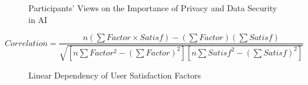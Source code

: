 \documentclass[12pt]{article}
\begin{document}
\begin{figure}[bht]
	\begin{center}
	{}
	\end{center}
	\vspace{-5mm} %
\caption{Participants' Views on the Importance of Privacy and Data Security in AI}
	\label{privacy and data security}
	\end{figure}
 
  \begin{equation}\label{correlation}
   Correlation = \frac{n(\sum Factor\times Satisf) - (\sum Factor)(\sum Satisf)}{\sqrt{[n\sum Factor^2 - (\sum Factor)^2][n\sum Satisf^2 - (\sum Satisf)^2]}}
  \end{equation}

\begin{figure}[bht]
	\begin{center}
	{}
	\end{center}
	\vspace{-5mm} %
\caption{Linear Dependency of User Satisfaction Factors}
	\label{linear tendency}
	\end{figure}
\end{document}
